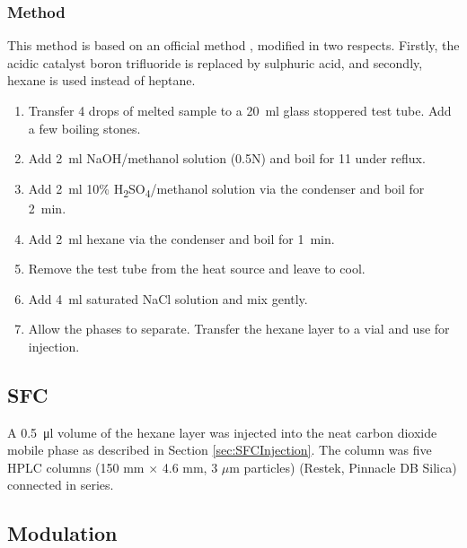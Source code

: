 \subsubsection{Method}

This method is based on an official method \autocite{AOCS2017}, modified in two
respects. Firstly, the acidic catalyst boron trifluoride is replaced by
sulphuric acid, and secondly, hexane is used instead of heptane.

\begin{enumerate}
  
\item Transfer \num{4} drops of melted sample to a \SI{20}{\milli\litre} glass
stoppered test tube. Add a few boiling stones.

\item Add \SI{2}{\milli\litre} NaOH/methanol solution (0.5N) and boil for
\SI{11}{\min} under reflux.

\item Add \SI{2}{\milli\litre} 10\%
H\textsubscript{2}SO\textsubscript{4}/methanol solution via the condenser and
boil for \SI{2}{\minute}.

\item  Add \SI{2}{\milli\litre} hexane via the condenser and boil for
\SI{1}{\minute}.

\item Remove the test tube from the heat source and leave to cool.

\item Add \SI{4}{\milli\litre} saturated NaCl solution and mix gently.

\item Allow the phases to separate. Transfer the hexane layer to a vial and use
for injection.

\end{enumerate}

\subsection{SFC}

A \SI{0.5}{\micro\litre} volume of the hexane layer was injected into the neat
carbon dioxide mobile phase as described in Section \ref{sec:SFCInjection}. The
column was five HPLC columns (150 mm $\times$ 4.6 mm, 3 $\mu$m particles)
(Restek, Pinnacle DB Silica) connected in series.

\subsection{Modulation}

